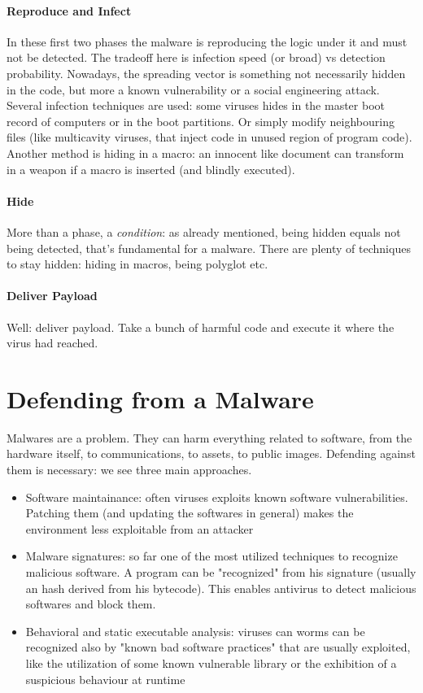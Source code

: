 \documentclass{article}
\begin{document}
			\paragraph{Reproduce and Infect}
				In these first two phases the malware is reproducing the logic under it and must not be detected. The tradeoff here is infection speed (or broad) vs detection probability. Nowadays, the spreading vector is something not necessarily hidden in the code, but more a known vulnerability or a social engineering attack. Several infection techniques are used: some viruses hides in the master boot record of computers or in the boot partitions. Or simply modify neighbouring files (like multicavity viruses, that inject code in unused region of program code).\\
				Another method is hiding in a macro: an innocent like document can transform in a weapon if a macro is inserted (and blindly executed). 
				
			\paragraph{Hide}
				More than a phase, a \emph{condition}: as already mentioned, being hidden equals not being detected, that's fundamental for a malware. There are plenty of techniques to stay hidden: hiding in macros, being polyglot etc. 
				
			\paragraph{Deliver Payload}
				Well: deliver payload. Take a bunch of harmful code and execute it where the virus had reached. 
	
		\section{Defending from a Malware}
			Malwares are a problem. They can harm everything related to software, from the hardware itself, to communications, to assets, to public images. Defending against them is necessary: we see three main approaches.
			\begin{itemize}
				\item Software maintainance: often viruses exploits known software vulnerabilities. Patching them (and updating the softwares in general) makes the environment less exploitable from an attacker
				\item Malware signatures: so far one of the most utilized techniques to recognize malicious software. A program can be "recognized" from his signature (usually an hash derived from his bytecode). This enables antivirus to detect malicious softwares and block them.
				\item Behavioral and static executable analysis: viruses can worms can be recognized also by "known bad software practices" that are usually exploited, like the utilization of some known vulnerable library or the exhibition of a suspicious behaviour at runtime
			\end{itemize}
			
\end{document}
